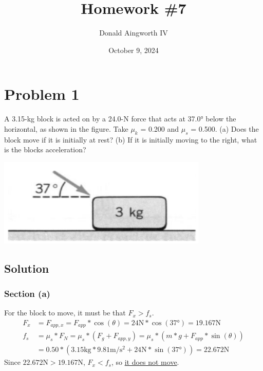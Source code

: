 \documentclass[12pt]{article}
\title{Homework \#7}
\author{Donald Aingworth IV}
\date{October 9, 2024}
\begin{document}

\maketitle
\pagebreak

\section*{Problem 1}
A 3.15-kg block is acted on by a 24.0-N force that acts at 37.0\unit{\degree} below the horizontal, as shown in the figure. Take $\mu_k$ = 0.200 and $\mu_s$ = 0.500. (a) Does the block move if it is initially at rest? (b) If it is initially moving to the right, what is the blocks acceleration?

\begin{center}
    \includegraphics*[width=10cm]{graph_1.png}
\end{center}

\subsection*{Solution}
\subsubsection*{Section (a)}
For the block to move, it must be that $F_x > f_s$.
\begin{align*}
    F_x &= F_{app,x} = F_{app}*\cos(\theta) = 24\unit{\newton}*\cos(37\unit{\degree}) = 19.167 \unit{\newton}\\
    f_s &= \mu_s * F_N = \mu_s * (F_g + F_{app,y}) 
        = \mu_s * (m*g + F_{app}*\sin(\theta))\\
        &= 0.50 * (3.15\unit{\kilo\gram}*9.81\unit{\meter/\second^2} + 24\unit{\newton}*\sin(37\unit{\degree})) = 22.672\unit{\newton}
\end{align*}
Since $22.672\unit{\newton} > 19.167 \unit{\newton}$, $F_x < f_s$, so \underline{it does not move}.
\end{document}
